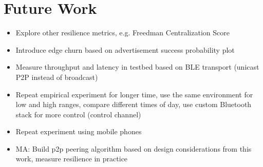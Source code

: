 \section{Future Work}
\begin{frame}
    \begin{itemize}
        \item Explore other resilience metrics, e.g. Freedman Centralization Score
        \item Introduce edge churn based on advertisement success probability plot
        \item Measure throughput and latency in testbed based on BLE transport (unicast P2P instead of broadcast)
        \item Repeat empirical experiment for longer time, use the same environment for low and high ranges, compare different times of day, use custom Bluetooth stack for more control (control channel)
        \item Repeat experiment using mobile phones 
        \item MA: Build p2p peering algorithm based on design considerations from this work, measure resilience in practice
    \end{itemize}
\end{frame}
